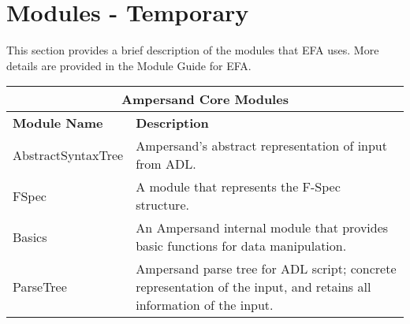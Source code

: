 \documentclass[12pt]{report}
\begin{document}

\chapter{Modules - Temporary }\label{ch:Modules_Temp}
This section provides a brief description of the modules that EFA uses. More 
details are provided in the Module Guide for EFA.

\begin{adjustbox}{center}
\begin{tabular}{ |p{3.2cm}|p{11cm}|  }
    \hline
    \multicolumn{2}{|c|}{\bfseries{\large{Ampersand Core Modules}}} \\ 
    \hline\hline
    \bfseries{Module Name} & \bfseries{Description}\\
    \hline
    AbstractSyntaxTree   & Ampersand's abstract representation of input from 
    ADL.   \\
    \hline
    FSpec &   A module that represents the F-Spec structure.\\
    \hline
    Basics & An Ampersand internal module that provides basic functions for 
    data manipulation.\\
    \hline
    ParseTree    & Ampersand parse tree for ADL script; concrete representation 
    of the input, and retains all information of the input. \\
    \hline
\end{tabular}
\end{adjustbox}
\end{document}
